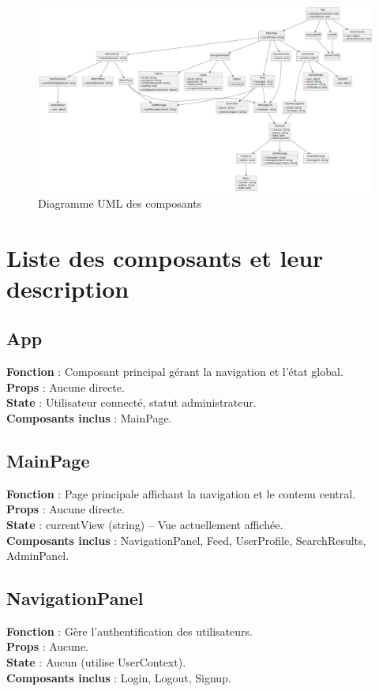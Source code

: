\documentclass{article}
\begin{document}
\vspace{1cm} %

\begin{figure}[h]
    \centering
    \includegraphics[width=1\linewidth]{Diagramme_uml.png}
    \caption{Diagramme UML des composants}
    \label{fig:uml_diagram}
\end{figure}

\section*{Liste des composants et leur description}

\subsection*{App}
\textbf{Fonction} : Composant principal gérant la navigation et l'état global.\\
\textbf{Props} : Aucune directe.\\
\textbf{State} : Utilisateur connecté, statut administrateur.\\
\textbf{Composants inclus} : MainPage.

\subsection*{MainPage}
\textbf{Fonction} : Page principale affichant la navigation et le contenu central.\\
\textbf{Props} : Aucune directe.\\
\textbf{State} : currentView (string) – Vue actuellement affichée.\\
\textbf{Composants inclus} : NavigationPanel, Feed, UserProfile, SearchResults, AdminPanel.

\subsection*{NavigationPanel}
\textbf{Fonction} : Gère l'authentification des utilisateurs.\\
\textbf{Props} : Aucune.\\
\textbf{State} : Aucun (utilise UserContext).\\
\textbf{Composants inclus} : Login, Logout, Signup.
\end{document}
